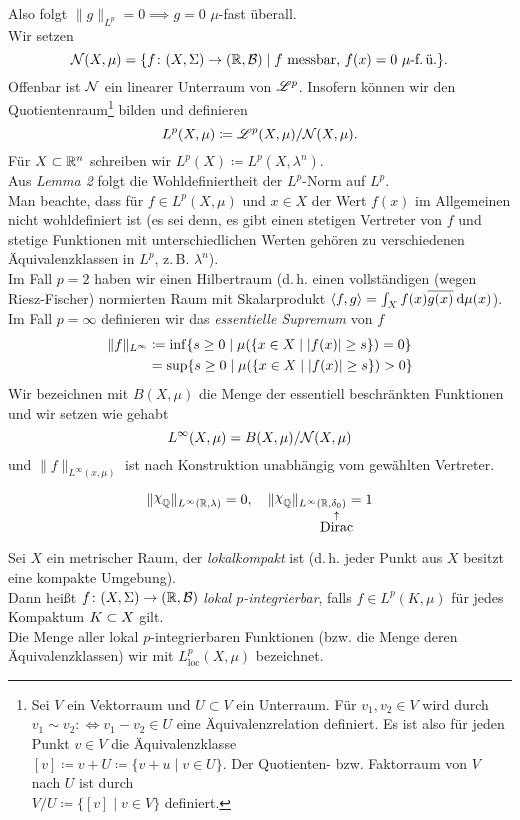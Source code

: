 \documentclass[skript.tex]{subfiles}
\begin{document}
	Also folgt $\lVert g \rVert_{L^p} = 0 \implies g = 0$ $\mu$-fast überall.\\
	Wir setzen
	\[
		\mathcal{N}(X,\mu) = \{f \colon (X,\Sigma) \to (\mathbb{R},\mathcal{B}) \mid f \text{ messbar, } f(x)=0 \text{ $\mu$-f.\,ü.} \}.
	\]
	Offenbar ist $\mathcal{N}$ ein linearer Unterraum von $\mathscr{L}^p$. Insofern können wir den Quotientenraum\footnote{
		Sei $V$ ein Vektorraum und $U \subset V$ ein Unterraum.
		Für $v_1, v_2 \in V$ wird durch $v_1 \sim v_2 :\Longleftrightarrow v_1-v_2 \in U$ eine Äquivalenzrelation definiert.
		Es ist also für jeden Punkt $v \in V$ die Äquivalenzklasse \\$[v] \coloneqq v+U \coloneqq \{v+u \mid v \in U \}$. 
		Der Quotienten- bzw. Faktorraum von $V$ nach $U$ ist durch \\$V/U \coloneqq \{[v] \mid v \in V\}$ definiert.} bilden und definieren
	\[
		L^p(X,\mu) \coloneqq \mathscr{L}^p(X,\mu) / \mathcal{N}(X,\mu).
	\]
	Für $X \subset \mathbb{R}^n$ schreiben wir $L^p(X) \coloneqq L^p(X,\lambda^n)$.\\
	Aus \emph{Lemma 2} folgt die Wohldefiniertheit der $L^p$-Norm auf $L^p$.\\ Man beachte, dass für $f \in L^p(X,\mu)$ und $x \in X$ der Wert $f(x)$ im Allgemeinen nicht wohldefiniert ist (es sei denn, es gibt einen stetigen Vertreter von $f$ und stetige Funktionen mit unterschiedlichen Werten gehören zu verschiedenen Äquivalenzklassen in $L^p$, z.\,B. $\lambda^n$).\medskip\\
	Im Fall $p=2$ haben wir einen Hilbertraum (d.\,h. einen vollständigen (wegen Riesz-Fischer) normierten Raum mit Skalarprodukt $\langle f,g\rangle = \int_X f(x) \overline{g(x)} \: \mathrm{d} \mu(x)$). \\
	Im Fall $p=\infty$ definieren wir das \emph{essentielle Supremum} von $f$
	\begin{align*}
		\lVert f \rVert_{L^\infty} &\coloneqq \inf\{s \geq 0 \mid \mu(\{x \in X \mid |f(x)| \geq s \}) = 0 \} \\
		&= \sup\{s \geq 0 \mid \mu(\{x \in X \mid |f(x)| \geq s \}) > 0 \}
	\end{align*}
	Wir bezeichnen mit $B(X,\mu)$ die Menge der essentiell beschränkten Funktionen und wir setzen wie gehabt
	\[
	L^\infty(X,\mu) = B(X,\mu) / \mathcal{N}(X,\mu)
	\]
	und $\lVert f \rVert_{L^\infty(x,\mu)}$ ist nach Konstruktion unabhängig vom gewählten Vertreter.
	\begin{bsp}
		\[
			\lVert \rchi_\mbb{Q} \rVert_{L^\infty(\mbb{R},\lambda)} = 0, \quad
			\lVert \rchi_\mbb{Q} \rVert_{L^\infty(\mbb{R},\underset{\displaystyle\mathclap{\overset{\uparrow}{\text{Dirac}}}}{\delta_0})} = 1
 		\]
	\end{bsp}
	Sei $X$ ein metrischer Raum, der \emph{lokalkompakt} ist (d.\,h. jeder Punkt aus $X$ besitzt eine kompakte Umgebung).\\
	Dann heißt $f \colon (X,\Sigma) \to (\mathbb{R},\mathcal{B})$ \emph{lokal $p$-integrierbar}, falls $f \in L^p(K,\mu)$ für jedes Kompaktum $K \subset X$ gilt. \\
	Die Menge aller lokal $p$-integrierbaren Funktionen (bzw. die Menge deren Äquivalenzklassen) wir mit $L_\text{loc}^p(X,\mu)$ bezeichnet.
	
\end{document}
